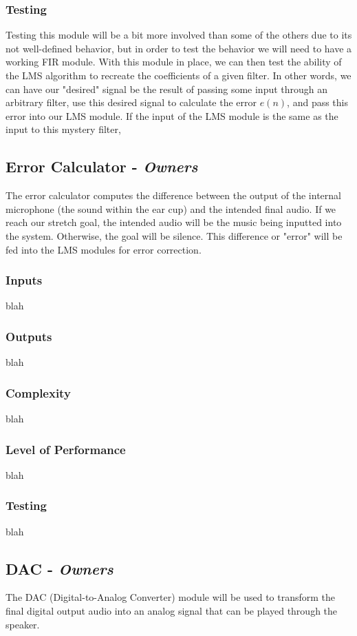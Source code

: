 \documentclass[12pt]{fpgairpods}
\begin{document}
\begin{multicols}{2}
\subsubsection{Testing}
Testing this module will be a bit more involved than some of the others due to its not well-defined behavior, but in order to test the behavior we will need to have a working FIR module. With this module in place, we can then test the ability of the LMS algorithm to recreate the coefficients of a given filter. In other words, we can have our "desired" signal be the result of passing some input through an arbitrary filter, use this desired signal to calculate the error $e(n)$, and pass this error into our LMS module. If the input of the LMS module is the same as the input to this mystery filter, 

\subsection{Error Calculator - \textit{Owners}}
The error calculator computes the difference between the output of the internal microphone (the sound within the ear cup) and the intended final audio. If we reach our stretch goal, the intended audio will be the music being inputted into the system. Otherwise, the goal will be silence. This difference or "error" will be fed into the LMS modules for error correction.
\subsubsection{Inputs}
blah
\subsubsection{Outputs}
blah
\subsubsection{Complexity}
blah
\subsubsection{Level of Performance}
blah
\subsubsection{Testing}
blah

\subsection{DAC - \textit{Owners}}
The DAC (Digital-to-Analog Converter) module will be used to transform the final digital output audio into an analog signal that can be played through the speaker.

\end{multicols}
\end{document}
